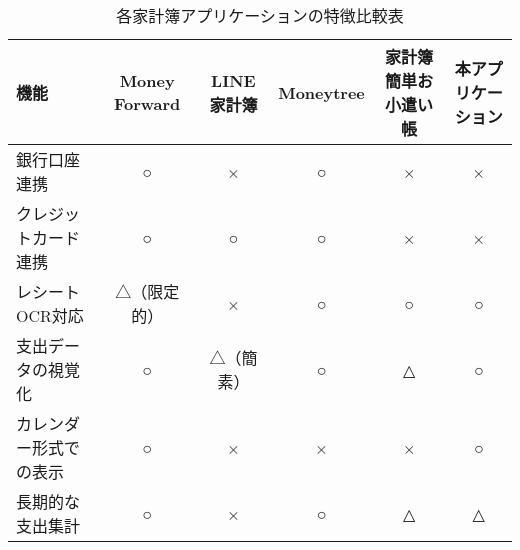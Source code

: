 \documentclass[main]{subfiles}
\begin{document}
\begin{table}[tbp]
    \centering
    \caption{各家計簿アプリケーションの特徴比較表}
    \label{tab:featureComparisonKakeibo}
    \small
    \begin{tabular}{|l|c|c|c|c|c|}
        \hline
        {機能} & {Money Forward} & {LINE家計簿} & {Moneytree} & {家計簿 簡単お小遣い帳} & {本アプリケーション} \\
        \hline
        銀行口座連携 & ○ & × & ○ & × & × \\
        \hline
        クレジットカード連携 & ○ & ○ & ○ & × & × \\
        \hline
        レシートOCR対応 & △（限定的） & × & ○ & ○ & ○ \\
        \hline
        支出データの視覚化 & ○ & △（簡素） & ○ & △ & ○ \\
        \hline
        カレンダー形式での表示 & ○ & × & × & × & ○ \\
        \hline
        長期的な支出集計 & ○ & × & ○ & △ & △ \\
        \hline
    \end{tabular}
\end{table}
\end{document}
